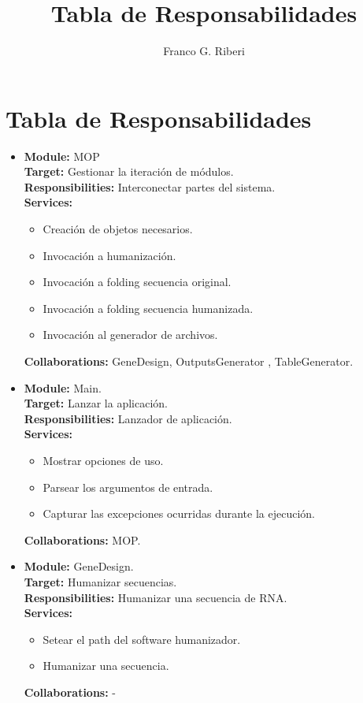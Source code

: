 \documentclass[12pt,a4paper]{article}
\title{Tabla de Responsabilidades}
\author{Franco G. Riberi}
\begin{document}

\section*{Tabla de Responsabilidades}

\begin{itemize}
    \item \textbf{Module:} MOP \\
    \textbf{Target:} Gestionar la iteración de módulos. \\
    \textbf{Responsibilities:} Interconectar partes del sistema. \\
    \textbf{Services:} 
        \begin{itemize}
            \item Creación de objetos necesarios.
            \item Invocación a humanización.
            \item Invocación a folding secuencia original.
            \item Invocación a folding secuencia humanizada.
            \item Invocación al generador de archivos.
        \end{itemize}
    \textbf{Collaborations:}	GeneDesign, OutputsGenerator , TableGenerator. \\

    \item \textbf{Module:} Main. \\
    \textbf{Target:} Lanzar la aplicación. \\
    \textbf{Responsibilities:} Lanzador de aplicación. \\
    \textbf{Services:}
        \begin{itemize}
            \item Mostrar opciones de uso.
            \item Parsear los argumentos de entrada.
            \item Capturar las excepciones ocurridas durante la ejecución.
        \end{itemize} 
    \textbf{Collaborations:}	MOP. \\

    \item \textbf{Module:} GeneDesign. \\
    \textbf{Target:}  Humanizar secuencias. \\
    \textbf{Responsibilities:} Humanizar una secuencia de RNA. \\
    \textbf{Services:}
        \begin{itemize}
            \item Setear el path del software humanizador.
            \item Humanizar una secuencia.
        \end{itemize} 
    \textbf{Collaborations:}	- \\


\end{itemize}
\end{document}
